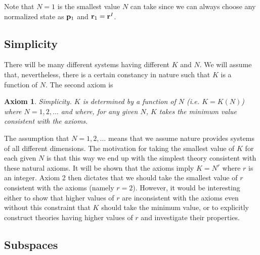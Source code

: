 \documentclass[10pt,twocolumn]{article}
\newtheorem{axiom}{Axiom}
\begin{document}
Note that $N=1$ is the smallest value $N$ can take since we can always
choose any normalized state as ${\bf p}_1$ and ${\bf r}_1={\bf r}^I$.

\subsection{Simplicity}

There will be many different systems having different $K$ and $N$.  We
will assume that, nevertheless, there is a certain constancy in nature
such that $K$ is a function of $N$.  The second axiom is
\begin{axiom}
{\rm Simplicity}. $K$ is determined by a function of $N$ (i.e.
$K=K(N)$) where $N=1,2,\dots$ and where, for any given $N$,
$K$ takes the minimum value consistent with the axioms.
\end{axiom}
The assumption that $N=1,2,\dots$ means that we assume nature
provides systems of all different dimensions.
The motivation for taking the smallest value of $K$ for each given $N$
is that this way we end up with the simplest theory consistent with
these natural axioms. It will be shown that the axioms imply
$K=N^r$ where $r$ is an integer. Axiom 2 then dictates that we should
take the smallest value of $r$ consistent with the axioms (namely $r=2$).
However, it would be interesting either to show that higher values of
$r$ are inconsistent with the axioms even without this constraint that
$K$ should take the minimum value, or to explicitly construct theories
having higher values of $r$ and investigate their properties.

\subsection{Subspaces}
\end{document}
